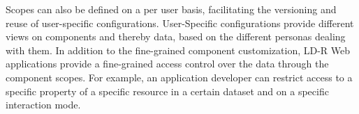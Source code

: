\documentclass{llncs}
\begin{document}
%
%
%
%

Scopes can also be defined on a per user basis, facilitating the versioning and reuse of user-specific configurations.
User-Specific configurations provide different views on components and thereby data, based on the different personas dealing with them.
In addition to the fine-grained component customization, LD-R Web applications provide a fine-grained access control over the data through the component scopes.
For example, an application developer can restrict access to a specific property of a specific resource in a certain dataset and on a specific interaction mode.
\end{document}
